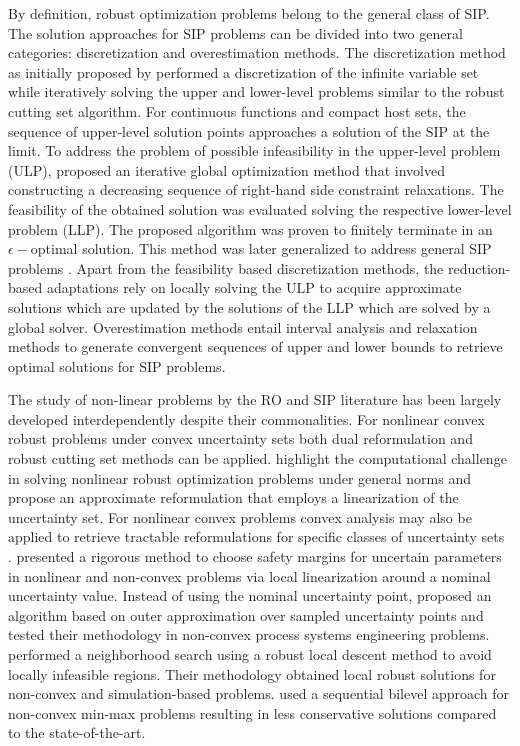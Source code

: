 \documentclass[sn-mathphys-num]{sn-jnl}
\begin{document}
By definition, robust optimization problems belong to the general class of SIP\citep{Stein2012}. The solution approaches for SIP problems can be divided into two general categories: discretization and overestimation methods. The discretization method as initially proposed by \citet{Blankenship1976} performed a discretization of the infinite variable set while iteratively solving the upper and lower-level problems  similar to the robust cutting set algorithm. For continuous functions and compact host sets, the sequence of upper-level solution points approaches a solution of the SIP at the limit.  To address the problem of possible infeasibility in the upper-level problem (ULP), \citet{Mitsos2011} proposed an iterative global optimization method that involved constructing a decreasing sequence of right-hand side constraint relaxations. The feasibility of the obtained solution was evaluated solving the respective lower-level problem (LLP). The proposed algorithm was proven to finitely terminate in an $\epsilon-$optimal solution.  This method was later generalized to address general SIP problems \cite{Mitsos2015}. Apart from the feasibility based discretization methods, the reduction-based adaptations rely on locally solving the ULP to acquire approximate solutions which are updated by the solutions of the LLP which are solved by a global solver\citep{LopezMarco2007,Seidel2022}. Overestimation methods entail interval analysis \citep{Bhattacharjee2005,Bhattacharjee2005math, Mitsos2008} and relaxation methods \citep{Floudas2007,Stein2012adaptive} to generate convergent sequences of upper and lower bounds to retrieve  optimal solutions for SIP problems.

The study of non-linear problems by the RO\citep{Leyffer2020, hung2024solution} and SIP \citep{Djelassi2021} literature has been largely developed interdependently despite their commonalities. For nonlinear convex robust problems under convex uncertainty sets both dual reformulation and robust cutting set methods can be applied. \citet{Diehl2005} highlight the computational challenge in solving nonlinear robust optimization problems under general norms and propose an approximate reformulation that employs a linearization of the uncertainty set. For nonlinear convex problems convex analysis may also be applied to retrieve tractable reformulations for specific classes of uncertainty sets \citep{BentalNRO, Gorissesn2015}. \citet{Zhang2007} presented a rigorous method to choose safety margins for uncertain parameters in nonlinear and non-convex problems via local linearization around a nominal uncertainty value. Instead of using the nominal uncertainty point, \citet{Li2018nro} proposed an algorithm based on outer approximation over sampled uncertainty points and tested their methodology in non-convex process systems engineering problems. \citet{Bertsimas2009} performed a neighborhood search using a robust local descent method to avoid locally infeasible regions. Their methodology obtained local robust solutions for non-convex and simulation-based problems. \citet{Houska2012} used a sequential bilevel approach for non-convex min-max problems resulting in less conservative solutions compared to the state-of-the-art.
\end{document}
